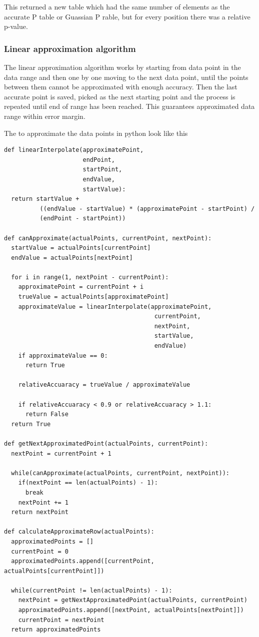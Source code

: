 \documentclass[12pt]{article}
\begin{document}
This returned a new table which had the same number of elements as the accurate P table or Guassian P rable, but for every position there was a relative p-value.

\subsubsection{Linear approximation algorithm}

The linear approximation algorithm works by starting from data point in the data range and then one by one moving to the next data point, until the points between them cannot be approximated with enough accuracy. Then the last accurate point is saved, picked as the next starting point and the process is repeated until end of range has been reached. This guarantees approximated data range within error margin.

The to approximate the data points in python look like this
\newpage
\begin{verbatim}
def linearInterpolate(approximatePoint,
                      endPoint,
                      startPoint,
                      endValue,
                      startValue):
  return startValue +
          ((endValue - startValue) * (approximatePoint - startPoint) /
          (endPoint - startPoint))

def canApproximate(actualPoints, currentPoint, nextPoint):
  startValue = actualPoints[currentPoint]
  endValue = actualPoints[nextPoint]

  for i in range(1, nextPoint - currentPoint):
    approximatePoint = currentPoint + i
    trueValue = actualPoints[approximatePoint]
    approximateValue = linearInterpolate(approximatePoint,
                                          currentPoint,
                                          nextPoint,
                                          startValue,
                                          endValue)
    if approximateValue == 0:
      return True

    relativeAccuaracy = trueValue / approximateValue

    if relativeAccuaracy < 0.9 or relativeAccuaracy > 1.1:
      return False
  return True

def getNextApproximatedPoint(actualPoints, currentPoint):
  nextPoint = currentPoint + 1

  while(canApproximate(actualPoints, currentPoint, nextPoint)):
    if(nextPoint == len(actualPoints) - 1):
      break
    nextPoint += 1
  return nextPoint

def calculateApproximateRow(actualPoints):
  approximatedPoints = []
  currentPoint = 0
  approximatedPoints.append([currentPoint, actualPoints[currentPoint]])

  while(currentPoint != len(actualPoints) - 1):
    nextPoint = getNextApproximatedPoint(actualPoints, currentPoint)
    approximatedPoints.append([nextPoint, actualPoints[nextPoint]])
    currentPoint = nextPoint
  return approximatedPoints

\end{verbatim}
\end{document}
